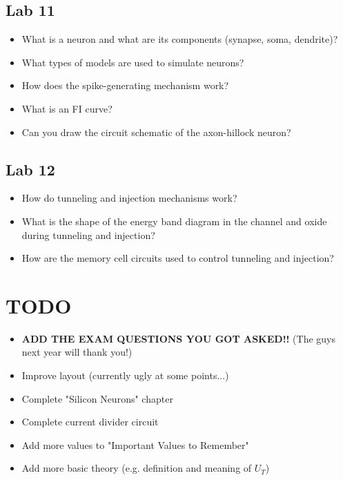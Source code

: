\subsection{Lab 11}
\begin{itemize}
\item What is a neuron and what are its components (synapse, soma, dendrite)? \item What types of
models are used to simulate neurons? \item How does the spike-generating mechanism work?
\item What is an FI curve? \item Can you draw the circuit schematic of the axon-hillock neuron?
\end{itemize}


\subsection{Lab 12}
\begin{itemize}
\item How do tunneling and injection mechanisms work? \item What is the shape of the energy band
diagram in the channel and oxide during tunneling and injection? \item How are the memory cell
circuits used to control tunneling and injection?
\end{itemize}

\section{TODO}
\begin{itemize}
\item \textbf{ADD THE EXAM QUESTIONS YOU GOT ASKED!!} (The guys next year will thank you!)
\item Improve layout (currently ugly at some points...)
\item Complete "Silicon Neurons" chapter
\item Complete current divider circuit
\item Add more values to "Important Values to Remember"
\item Add more basic theory (e.g. definition and meaning of $U_T$)
\end{itemize}

